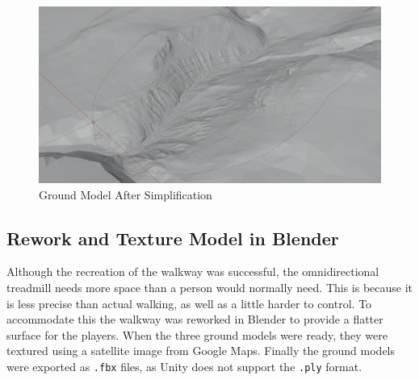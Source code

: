         \FloatBarrier
        \begin{figure}[htbp]
            \centering
            \includegraphics[width=\ImageWidth]{figures/post_simplification.PNG}
            \caption{Ground Model After Simplification}
            \label{fig:post_simplification}
        \end{figure}
        \FloatBarrier
    
    \subsection{Rework and Texture Model in Blender}
        Although the recreation of the walkway was successful, the omnidirectional treadmill needs more space than a person would normally need. This is because it is less precise than actual walking, as well as a little harder to control. To accommodate this the walkway was reworked in Blender to provide a flatter surface for the players. When the three ground models were ready, they were textured using a satellite image from Google Maps. Finally the ground models were exported as \texttt{.fbx} files, as Unity does not support the \texttt{.ply} format.
        
